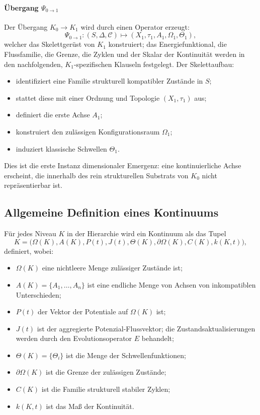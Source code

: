 \paragraph{Übergang \texorpdfstring{$\Psi_{0\to 1}$}{Psi\_0\_to\_1}}
Der Übergang \(K_0 \to K_1\) wird durch einen Operator erzeugt:
\[
    \Psi_{0\to 1} : (S,\Delta,\mathcal{C}) \mapsto (X_1,\tau_1,A_1,\Omega_1,\Theta_1),
\]
welcher das Skelettgerüst von \(K_1\) konstruiert; das Energiefunktional,
die Flussfamilie, die Grenze, die Zyklen und der Skalar der Kontinuität werden
in den nachfolgenden, \(K_1\)-spezifischen Klauseln festgelegt.
Der Skelettaufbau:
\begin{itemize}
    \item identifiziert eine Familie strukturell kompatibler Zustände in \(S\);
    \item stattet diese mit einer Ordnung und Topologie \((X_1,\tau_1)\) aus;
    \item definiert die erste Achse \(A_1\);
    \item konstruiert den zulässigen Konfigurationsraum \(\Omega_1\);
    \item induziert klassische Schwellen \(\Theta_1\).
\end{itemize}
Dies ist die erste Instanz dimensionaler Emergenz: eine kontinuierliche Achse
erscheint, die innerhalb des rein strukturellen Substrats von \(K_0\) nicht
repräsentierbar ist.

\subsection{Allgemeine Definition eines Kontinuums}

Für jedes Niveau \(K\) in der Hierarchie wird ein Kontinuum als das Tupel
\[
    K = \big(\Omega(K), A(K), P(t), J(t), \Theta(K), \partial\Omega(K), C(K), k(K,t)\big),
\]
definiert, wobei:
\begin{itemize}
    \item \(\Omega(K)\) eine nichtleere Menge zulässiger Zustände ist;
    \item \(A(K) = \{A_1,\dots,A_n\}\) ist eine endliche Menge von Achsen
von inkompatiblen Unterschieden;
    \item \(P(t)\) der Vektor der Potentiale auf \(\Omega(K)\) ist;
    \item \(J(t)\) ist der aggregierte Potenzial-Flussvektor; die
          Zustandsaktualisierungen werden durch den Evolutionsoperator \(E\)
          behandelt;
    \item \(\Theta(K) = \{\Theta_i\}\) ist die Menge der Schwellenfunktionen;
    \item \(\partial\Omega(K)\) ist die Grenze der zulässigen Zustände;
    \item \(C(K)\) ist die Familie strukturell stabiler Zyklen;
    \item \(k(K,t)\) ist das Maß der Kontinuität.
\end{itemize}

